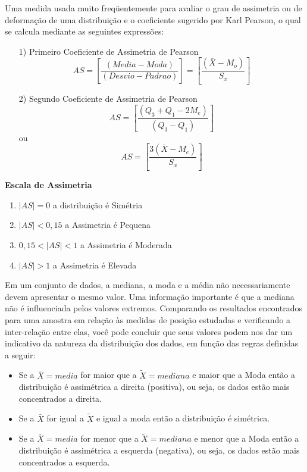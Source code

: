 
Uma medida usada muito freqüentemente para avaliar o grau de assimetria ou de deformação de uma distribuição e o coeficiente sugerido por Karl Pearson, o qual se calcula mediante as seguintes expressões:

\begin{enumerate}
  \item [{1)}]Primeiro Coeficiente de Assimetria de Pearson
  \begin{equation}\label{assimetria}
    AS = \left[ \frac{(Media-Moda)}{(Desvio-Padrao)} \right] = \left[  \frac{(\bar{X}-M_{o})}{S_{x}} \right]
\end{equation}
  \item [{2)}]Segundo Coeficiente de Assimetria de Pearson
  \begin{equation}\label{assimetria}
    AS = \left[ \frac{(Q_{3}+Q_{1}-2M_{e})}{(Q_{3}-Q_{1})} \right]
\end{equation}
    ou
 \begin{equation}
    AS = \left[ \frac{3(\bar{X}-M_{e})}{S_{x}} \right]
\end{equation}
\end{enumerate}






\textbf{Escala de Assimetria}

\begin{enumerate}
\item $|AS| =0$ a distribuição é Simétria
\item $|AS| < 0,15$ a Assimetria é Pequena
\item $0,15 < |AS| <1$ a Assimetria é Moderada
\item $|AS| > 1$ a Assimetria é Elevada
\end{enumerate}


\newpage 

Em um conjunto de dados, a mediana, a moda e a média
não necessariamente devem apresentar o mesmo valor. Uma
informação importante é que a mediana não é influenciada pelos valores extremos. Comparando os resultados encontrados para uma amostra em relação às medidas de posição estudadas e verificando a inter-relação entre elas, você pode concluir que seus valores podem nos dar um indicativo da natureza da distribuição dos dados, em função das regras definidas a seguir:


\begin{itemize}
\item Se a $\bar{X}=media$ for maior que a $\tilde{X}=mediana$ e maior que a Moda então a distribuição é assimétrica a direita (positiva), ou seja, os dados estão mais concentrados a direita.  	
\item Se a $\bar{X}$ for igual a $\tilde{X}$ e igual a moda então a distribuição é simétrica.
\item Se a $\bar{X}= media$ for menor que a $\tilde{X}= mediana$ e menor que a Moda então a distribuição é assimétrica a esquerda (negativa), ou seja, os dados estão mais concentrados a esquerda. 	
\end{itemize}

